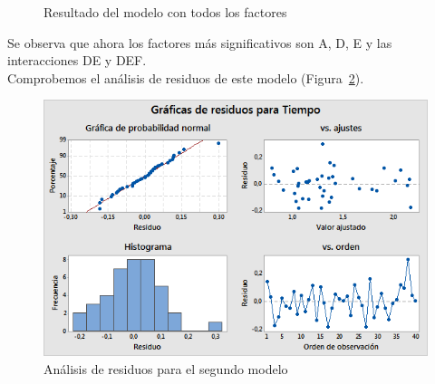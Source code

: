 \documentclass[12pt,a4paper,twoside,openright,titlepage,final]{article}
\begin{document}
\begin{figure}[htbp!]
	\centering
	\caption{Resultado del modelo con todos los factores} \label{fig:resultado_experimento_fraccional_2}
\end{figure}

Se observa que ahora los factores más significativos son A, D, E y las interacciones DE y DEF.\\

Comprobemos el análisis de residuos de este modelo (Figura~\ref{fig:residuos_2}).\\

\begin{figure}[htbp!]
	\centering
	\includegraphics[width=0.7\linewidth]{imagenes/Experimento_fraccional/Graficas_de_residuos_para_Tiempo_2}
	\caption{Análisis de residuos para el segundo modelo}
	\label{fig:residuos_2}
\end{figure}
\end{document}
